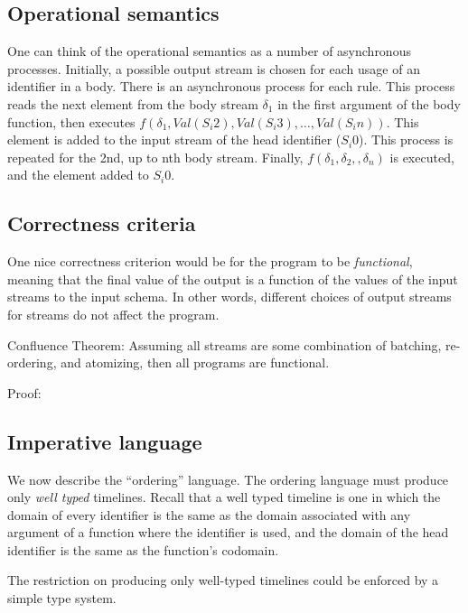 \subsection{Operational semantics}



One can think of the operational semantics as a number of asynchronous processes.  Initially, a possible output stream is chosen for each usage of an identifier in a body.  There is an asynchronous process for each rule.  This process reads the next element from the body stream $\delta_1$ in the first argument of the body function, then executes $f(\delta_1, Val(S_i2), Val(S_i3), \dots, Val(S_in))$.  This element is added to the input stream of the head identifier ($S_i0$).  This process is repeated for the 2nd, up to nth body stream.  Finally, $f(\delta_1, \delta_2, , \delta_n)$ is executed, and the element added to $S_i0$.



\subsection{Correctness criteria}

One nice correctness criterion would be for the program to be {\em functional}, meaning that the final value of the output is a function of the values of the input streams to the input schema.  In other words, different choices of output streams for streams do not affect the program.

Confluence Theorem: Assuming all streams are some combination of batching, re-ordering, and atomizing, then all programs are functional.

Proof: 


\subsection{Imperative language}

We now describe the ``ordering'' language.  The ordering language must produce only {\em well typed} timelines.  Recall that a well typed timeline is one in which the domain of every identifier is the same as the domain associated with any argument of a function where the identifier is used, and the domain of the head identifier is the same as the function's codomain.

The restriction on producing only well-typed timelines could be enforced by a simple type system.





